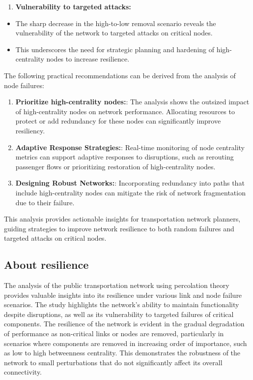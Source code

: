 \documentclass[
  letterpaper,
  DIV=11,
  numbers=noendperiod]{scrartcl}
\providecommand{\tightlist}{%
  \setlength{\itemsep}{0pt}\setlength{\parskip}{0pt}}\usepackage{longtable,booktabs,array}
\begin{document}
\begin{enumerate}
\def\labelenumi{\arabic{enumi}.}
\setcounter{enumi}{2}
\tightlist
\item
  \textbf{Vulnerability to targeted attacks:}
\end{enumerate}

\begin{itemize}
\tightlist
\item
  The sharp decrease in the high-to-low removal scenario reveals the
  vulnerability of the network to targeted attacks on critical nodes.
\item
  This underscores the need for strategic planning and hardening of
  high-centrality nodes to increase resilience.
\end{itemize}

The following practical recommendations can be derived from the analysis
of node failures:

\begin{enumerate}
\def\labelenumi{\arabic{enumi}.}
\tightlist
\item
  \textbf{Prioritize high-centrality nodes:}: The analysis shows the
  outsized impact of high-centrality nodes on network performance.
  Allocating resources to protect or add redundancy for these nodes can
  significantly improve resiliency.
\item
  \textbf{Adaptive Response Strategies:}: Real-time monitoring of node
  centrality metrics can support adaptive responses to disruptions, such
  as rerouting passenger flows or prioritizing restoration of
  high-centrality nodes.
\item
  \textbf{Designing Robust Networks:}: Incorporating redundancy into
  paths that include high-centrality nodes can mitigate the risk of
  network fragmentation due to their failure.
\end{enumerate}

This analysis provides actionable insights for transportation network
planners, guiding strategies to improve network resilience to both
random failures and targeted attacks on critical nodes.

\subsection{About resilience}\label{about-resilience}

The analysis of the public transportation network using percolation
theory provides valuable insights into its resilience under various link
and node failure scenarios. The study highlights the network's ability
to maintain functionality despite disruptions, as well as its
vulnerability to targeted failures of critical components. The
resilience of the network is evident in the gradual degradation of
performance as non-critical links or nodes are removed, particularly in
scenarios where components are removed in increasing order of
importance, such as low to high betweenness centrality. This
demonstrates the robustness of the network to small perturbations that
do not significantly affect its overall connectivity.
\end{document}
